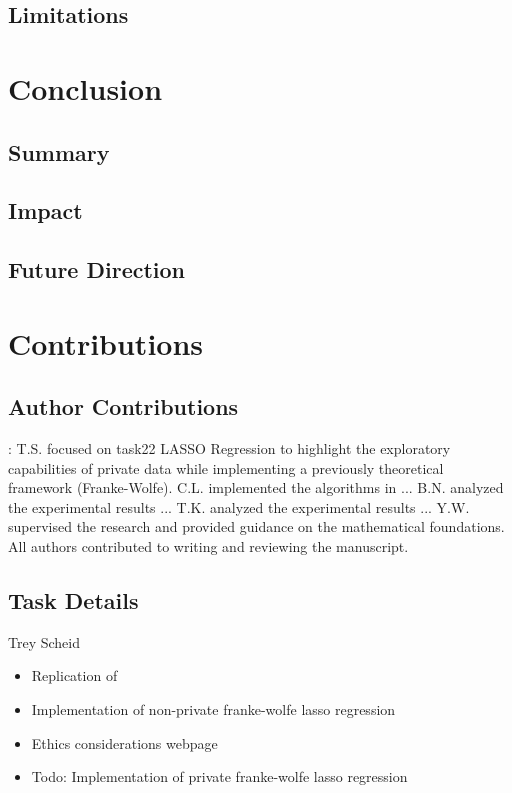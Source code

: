 \documentclass[12pt,letterpaper]{article}
\begin{document}
\subsection{Limitations}




\section{Conclusion}


\subsection{Summary}


\subsection{Impact}


\subsection{Future Direction}



\section{Contributions}

\subsection{Author Contributions}:
T.S. focused on task22 LASSO Regression to highlight the exploratory capabilities of private data while implementing a previously theoretical framework (Franke-Wolfe). C.L. implemented the algorithms in ... B.N. analyzed the experimental results ... T.K. analyzed the experimental results ... Y.W. supervised the research and provided guidance on the mathematical foundations. All authors contributed to writing and reviewing the manuscript.

\subsection{Task Details}

Trey Scheid
\begin{itemize}
    \item Replication of 
    \item Implementation of non-private franke-wolfe lasso regression
    \item Ethics considerations webpage
    \item [ ] Todo: Implementation of private franke-wolfe lasso regression
\end{itemize}
\end{document}
